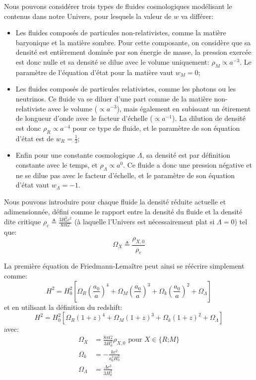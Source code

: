 \documentclass[../main/main.tex]{subfiles}
\begin{document}
Nous pouvons considérer trois types de fluides cosmologiques modélisant
le contenus dans notre
Univers, pour lesquels la valeur de $w$ va différer:
\begin{itemize}
\item Les fluides composés de particules non-relativistes, comme la
  matière baryonique et la matière sombre. Pour cette composante, on
  considère que sa densité est entièrement dominée par son énergie de
  masse, la pression exercée est donc
  nulle et sa densité se dilue avec le volume uniquement:
  $\rho_{M}\propto a^{-3}$. Le paramètre de l'équation d'état pour la matière vaut $w_{M}=0$;
\item Les fluides composés de particules relativistes, comme les
  photons ou les neutrinos. Ce fluide va se diluer d'une part comme
  de la matière non-relativiste avec le volume ($\propto a^{-3}$), mais également en
  subissant un étirement de longueur d'onde avec le facteur d'échelle
  ($\propto a^{-1}$). La dilution de densité est donc
  $\rho_{R}\propto a^{-4}$ pour ce type de fluide, et le paramètre de son équation d'état est de
  $w_{R}=\frac{1}{3}$;
\item Enfin pour une constante cosmologique $\Lambda$, sa densité est
  par définition constante avec le temps, et $\rho_{\Lambda}\propto
  a^{0}$. Ce fluide a donc une pression négative et ne se dilue pas
  avec le facteur d'échelle, et le paramètre de son équation d'état vaut $w_{\Lambda}=-1$.
\end{itemize}

Nous pouvons introduire pour chaque fluide la densité réduite actuelle et
adimensionnée, défini comme le
rapport entre la densité du fluide et la densité dite critique
$\rho_{c}\triangleq\frac{3H_{0}^{2}c^{2}}{8\pi G}$ (à
laquelle l'Univers est nécessairement plat si $\Lambda=0$) tel que:
\begin{equation}
  \label{eq:33}
  \Omega_{X}\triangleq\frac{\rho_{X,0}}{\rho_{c}}
\end{equation}

La première équation de Friedmann-Lemaître peut ainsi se réécrire
simplement comme:
\begin{equation}
  \label{eq:friedmannOmega}
  H^{2}=H_{0}^{2}\left[\Omega_{R}\left(\frac{a_{0}}{a}\right)^{4}
    +\Omega_{M}\left(\frac{a_{0}}{a}\right)^{3} +\Omega_{k}\left(\frac{a_{0}}{a}\right)^{2}+\Omega_{\Lambda} \right]
\end{equation}
et en utilisant la définition du redshift:
\begin{equation}
  \label{eq:friedmannZ}
  H^{2}=H_{0}^{2}\left[\Omega_{R}(1+z)^{4}
    +\Omega_{M}(1+z)^{3} +\Omega_{k}(1+z)^{2}+\Omega_{\Lambda} \right]
\end{equation}
avec:
\begin{align*}
  \Omega_{X}&=\frac{8\pi G}{3H_{0}^{2}}\rho_{X,0} \text{ pour
  $X\in$\{$R$;$M$\}}\\
  \Omega_{k}&=-\frac{kc^{2}}{a_{0}^{2}H_{0}^{2}}\\
  \Omega_{\Lambda}&=\frac{\Lambda c^{2}}{3H_{0}^{2}}
\end{align*}
\end{document}
